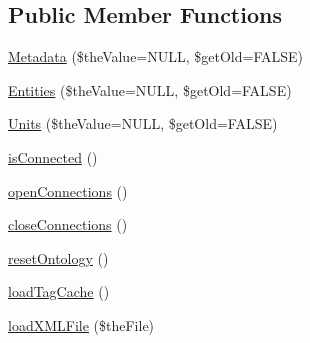 \subsection*{Public Member Functions}
\begin{DoxyCompactItemize}
\item 
\hyperlink{class_ontology_wrapper_1_1_wrapper_a58530473d4c2b9847a72b4568c7c52bb}{Metadata} (\$the\-Value=N\-U\-L\-L, \$get\-Old=F\-A\-L\-S\-E)
\item 
\hyperlink{class_ontology_wrapper_1_1_wrapper_aa3446362c7c65332a05e53546dbc7ea2}{Entities} (\$the\-Value=N\-U\-L\-L, \$get\-Old=F\-A\-L\-S\-E)
\item 
\hyperlink{class_ontology_wrapper_1_1_wrapper_a04c8c36bebf40208956e797b5dc64fec}{Units} (\$the\-Value=N\-U\-L\-L, \$get\-Old=F\-A\-L\-S\-E)
\item 
\hyperlink{class_ontology_wrapper_1_1_wrapper_a94bab4d3e13b169479d5a0f9d16ea3fc}{is\-Connected} ()
\item 
\hyperlink{class_ontology_wrapper_1_1_wrapper_ae402cf57a8c037c3fe580baa252e99ac}{open\-Connections} ()
\item 
\hyperlink{class_ontology_wrapper_1_1_wrapper_a41ab06d375f9baae6349b4955ab8384e}{close\-Connections} ()
\item 
\hyperlink{class_ontology_wrapper_1_1_wrapper_a386b16160195cbb9c60d858b5677c1b4}{reset\-Ontology} ()
\item 
\hyperlink{class_ontology_wrapper_1_1_wrapper_ae03422dc6a2e5f5e03726b85f62a1f12}{load\-Tag\-Cache} ()
\item 
\hyperlink{class_ontology_wrapper_1_1_wrapper_a2ee823f34e78d0a1f2361d6da3f58532}{load\-X\-M\-L\-File} (\$the\-File)
\end{DoxyCompactItemize}
